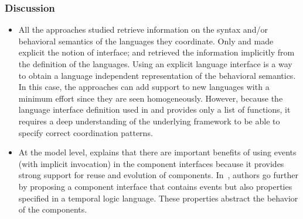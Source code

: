 	\subsubsection{Discussion}
	\begin{itemize}
	
	    	\item All the approaches studied retrieve information on the syntax and/or behavioral semantics of the languages they coordinate. Only \cite{ptolemybib} and \cite{modhelxbib} made explicit the notion of interface; \cite{MarcoModels2014} and \cite{mascotbib} retrieved the information implicitly from the definition of the languages. 
	    	Using an explicit language interface is a way to obtain a language independent representation of the behavioral semantics. In this case, the approaches can add support to new languages with a minimum effort since they are seen homogeneously. However, because the language interface definition used in \cite{ptolemybib} and \cite{modhelxbib} provides only a list of functions, it requires a deep understanding of the underlying framework to be able to specify correct coordination patterns. 
	    	
	    	\item At the model level, \cite{garlansoftarchbib} explains that there are important benefits of using events (with implicit invocation) in the component interfaces because it provides strong support for reuse and evolution of components. 
	    	In~\cite{coordinainterfacebib}, authors go further by proposing a component interface that contains events but also properties specified in a temporal logic language. These properties abstract the behavior of the components.
	    	

\end{itemize}
